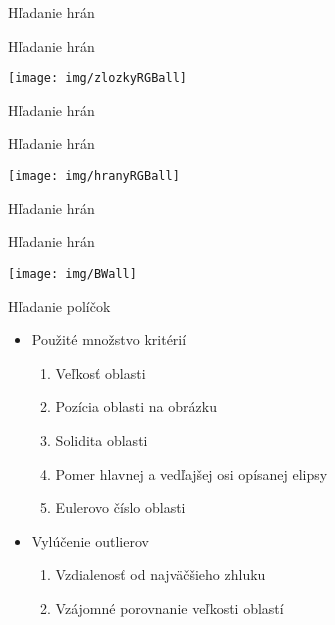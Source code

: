 \documentclass[red]{beamer}
\begin{document}
\begin{frame}{Hľadanie hrán}
\end{frame}



\begin{frame}{Hľadanie hrán}
\centerline{\texttt{[image: img/zlozkyRGBall]}}
\end{frame}



\begin{frame}{Hľadanie hrán}
\end{frame}



\begin{frame}{Hľadanie hrán}
\centerline{\texttt{[image: img/hranyRGBall]}}
\end{frame}



\begin{frame}{Hľadanie hrán}
\end{frame}



\begin{frame}{Hľadanie hrán}
\centerline{\texttt{[image: img/BWall]}}
\end{frame}



\begin{frame}{Hľadanie políčok}
\pause
\begin{itemize}
\item Použité množstvo kritérií
\begin{enumerate}[-]
\pause
\item Veľkosť oblasti
\pause
\item Pozícia oblasti na obrázku
\pause
\item Solidita oblasti
\pause
\item Pomer hlavnej a vedľajšej osi opísanej elipsy
\pause
\item Eulerovo číslo oblasti
\end{enumerate}
\end{itemize}

\pause
\begin{itemize}
\item Vylúčenie outlierov
\begin{enumerate}[-]
\pause
\item Vzdialenosť od najväčšieho zhluku
\pause
\item Vzájomné porovnanie veľkosti oblastí
\end{enumerate}
\end{itemize}
\end{frame}
\end{document}
